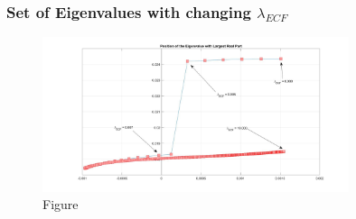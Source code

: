 \documentclass[12pt]{article}
\renewcommand{\(}{\left (}
\renewcommand{\)}{\right )}
\begin{document}
\subsubsection{Set of Eigenvalues with changing $\lambda_{ECF}$}

\begin{figure}[ht]
    \centering
	\begin{minipage}{0.99\textwidth}
		\centering
		\includegraphics[width=0.8\textwidth]{all_lambda_Ei.jpg}
		\caption*{\small Figure}
	\end{minipage}
\end{figure}

\end{document}

